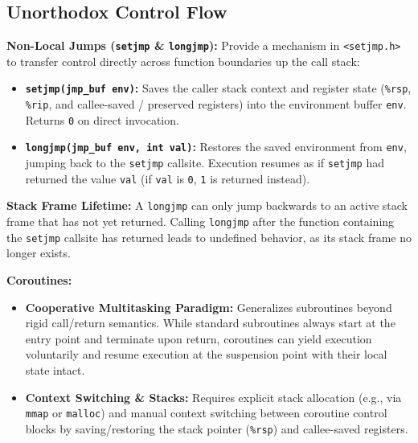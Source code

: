 \subsection{Unorthodox Control Flow}

\begin{definition}
    \textbf{Non-Local Jumps (\texttt{setjmp} \& \texttt{longjmp}):} Provide a mechanism in \texttt{<setjmp.h>} to transfer control directly across function boundaries up the call stack:
    \begin{itemize}
        \item \textbf{\texttt{setjmp(jmp\_buf env)}:} Saves the caller stack context and register state (\texttt{\%rsp}, \texttt{\%rip}, and callee-saved / preserved registers) into the environment buffer \texttt{env}. Returns \texttt{0} on direct invocation.
        \item \textbf{\texttt{longjmp(jmp\_buf env, int val)}:} Restores the saved environment from \texttt{env}, jumping back to the \texttt{setjmp} callsite. Execution resumes as if \texttt{setjmp} had returned the value \texttt{val} (if \texttt{val} is \texttt{0}, \texttt{1} is returned instead).
    \end{itemize}
\end{definition}

\begin{important}
    \textbf{Stack Frame Lifetime:} A \texttt{longjmp} can only jump backwards to an active stack frame that has not yet returned. Calling \texttt{longjmp} after the function containing the \texttt{setjmp} callsite has returned leads to undefined behavior, as its stack frame no longer exists.
\end{important}

\begin{definition}
    \textbf{Coroutines:}
    \begin{itemize}
        \item \textbf{Cooperative Multitasking Paradigm:} Generalizes subroutines beyond rigid call/return semantics. While standard subroutines always start at the entry point and terminate upon return, coroutines can yield execution voluntarily and resume execution at the suspension point with their local state intact.
        \item \textbf{Context Switching \& Stacks:} Requires explicit stack allocation (e.g., via \texttt{mmap} or \texttt{malloc}) and manual context switching between coroutine control blocks by saving/restoring the stack pointer (\texttt{\%rsp}) and callee-saved registers.
    \end{itemize}
\end{definition}

